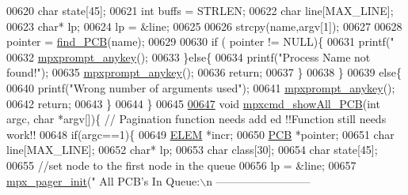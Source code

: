 \begin{DoxyCode}
{00620                 \textcolor{keywordtype}{char} state[45];
00621                 \textcolor{keywordtype}{int} buffs = STRLEN;
00622                 \textcolor{keywordtype}{char} line[MAX\_LINE];
00623                 \textcolor{keywordtype}{char}* lp;
00624                 lp = &line;
00625                 
00626                 strcpy(name,argv[1]);
00627                 
00628                 pointer = \hyperlink{mpx__r2_8c_a612a6abcb66c688a32f33abc93ff3990}{find_PCB}(name);
00629                 
00630                 \textcolor{keywordflow}{if} ( pointer != NULL)\{
00631                         printf(\textcolor{stringliteral}{"%
00632                         \hyperlink{mpx__util_8c_a338d01dfe3c80732c00450203c85b964}{mpxprompt_anykey}();
00633                 \}\textcolor{keywordflow}{else}\{
00634                         printf(\textcolor{stringliteral}{"Process Name not found!"});
00635                         \hyperlink{mpx__util_8c_a338d01dfe3c80732c00450203c85b964}{mpxprompt_anykey}();
00636                         \textcolor{keywordflow}{return};
00637                 \}
00638         \}
00639         \textcolor{keywordflow}{else}\{
00640                 printf(\textcolor{stringliteral}{"Wrong number of arguments used"});
00641                 \hyperlink{mpx__util_8c_a338d01dfe3c80732c00450203c85b964}{mpxprompt_anykey}();
00642                 \textcolor{keywordflow}{return};
00643         \}
00644 \}
00645 
\hypertarget{mpx__r2_8c_source_l00647}{}\hyperlink{mpx__r2_8h_a69559f93fe1b569abf6e846a426191a9}{00647} \textcolor{keywordtype}{void} \hyperlink{mpx__r2_8c_a69559f93fe1b569abf6e846a426191a9}{mpxcmd_showAll_PCB}(\textcolor{keywordtype}{int} argc, \textcolor{keywordtype}{char} *argv[])\{ \textcolor{comment}{// Pagination function needs add
      ed !!Function still needs work!!}
00648         \textcolor{keywordflow}{if}(argc==1)\{
00649                 \hyperlink{structpage}{ELEM} *incr;
00650                 \hyperlink{structprocess}{PCB} *pointer;
00651                 \textcolor{keywordtype}{char} line[MAX\_LINE];
00652                 \textcolor{keywordtype}{char}* lp;
00653                 \textcolor{keywordtype}{char} \textcolor{keyword}{class}[30];
00654                 \textcolor{keywordtype}{char} state[45];
00655                 \textcolor{comment}{//set node to the first node in the queue}
00656                 lp = &line;
00657                 \hyperlink{mpx__util_8c_a60afdb7496b6ff469c6b98d2ecde15ed}{mpx_pager_init}(\textcolor{stringliteral}{" All PCB's In Queue:\(\backslash\)n --------------------------
}}}
\end{DoxyCode}
